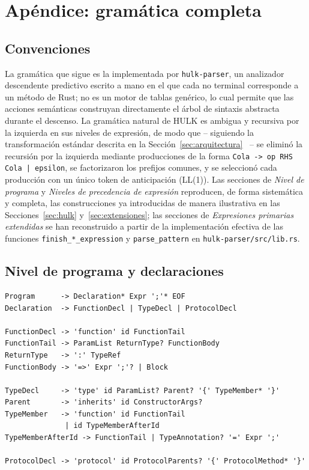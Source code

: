 \documentclass[12pt, a4paper]{article}
\begin{document}

\section{Apéndice: gramática completa}
\label{sec:apendice-gramatica}

\subsection{Convenciones}

La gramática que sigue es la implementada por \texttt{hulk-parser}, un
analizador descendente predictivo escrito a mano en el que cada no terminal
corresponde a un método de Rust; no es un motor de tablas genérico, lo cual
permite que las acciones semánticas construyan directamente el árbol de
sintaxis abstracta durante el descenso. La gramática natural de HULK es
ambigua y recursiva por la izquierda en sus niveles de expresión, de modo que
-- siguiendo la transformación estándar descrita en la Sección~\ref{sec:arquitectura}~\cite{aho1986}
-- se eliminó la recursión por la izquierda mediante producciones de la
forma \texttt{Cola -> op RHS Cola | epsilon}, se factorizaron los prefijos
comunes, y se seleccionó cada producción con un único token de anticipación
(LL(1)). Las secciones de \textit{Nivel de programa} y \textit{Niveles de
precedencia de expresión} reproducen, de forma sistemática y completa, las
construcciones ya introducidas de manera ilustrativa en las
Secciones~\ref{sec:hulk} y~\ref{sec:extensiones}; las secciones de
\textit{Expresiones primarias extendidas} se han reconstruido a partir de la
implementación efectiva de las funciones \texttt{finish\_*\_expression} y
\texttt{parse\_pattern} en \texttt{hulk-parser/src/lib.rs}.

\subsection{Nivel de programa y declaraciones}

\begin{lstlisting}[language={}]
Program      -> Declaration* Expr ';'* EOF
Declaration  -> FunctionDecl | TypeDecl | ProtocolDecl

FunctionDecl -> 'function' id FunctionTail
FunctionTail -> ParamList ReturnType? FunctionBody
ReturnType   -> ':' TypeRef
FunctionBody -> '=>' Expr ';'? | Block

TypeDecl     -> 'type' id ParamList? Parent? '{' TypeMember* '}'
Parent       -> 'inherits' id ConstructorArgs?
TypeMember   -> 'function' id FunctionTail
              | id TypeMemberAfterId
TypeMemberAfterId -> FunctionTail | TypeAnnotation? '=' Expr ';'

ProtocolDecl -> 'protocol' id ProtocolParents? '{' ProtocolMethod* '}'
\end{lstlisting}
\end{document}
